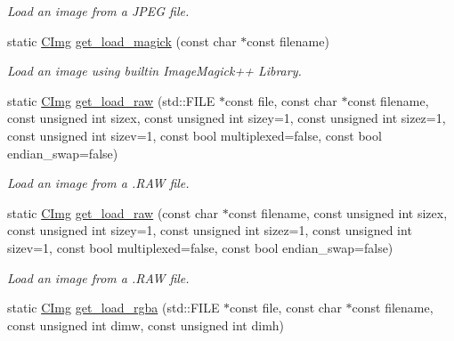 \begin{DoxyCompactItemize}
\begin{DoxyCompactList}\small\item\em Load an image from a J\-P\-E\-G file. \end{DoxyCompactList}\item 
static \hyperlink{structcimg__library_1_1_c_img}{C\-Img} \hyperlink{structcimg__library_1_1_c_img_a263aadb8d074a96e73f67908853ef501}{get\-\_\-load\-\_\-magick} (const char $\ast$const filename)
\begin{DoxyCompactList}\small\item\em Load an image using builtin Image\-Magick++ Library. \end{DoxyCompactList}\item 
\hypertarget{structcimg__library_1_1_c_img_a980e8f9a7706398cfca97eca26b97a70}{static \hyperlink{structcimg__library_1_1_c_img}{C\-Img} \hyperlink{structcimg__library_1_1_c_img_a980e8f9a7706398cfca97eca26b97a70}{get\-\_\-load\-\_\-raw} (std\-::\-F\-I\-L\-E $\ast$const file, const char $\ast$const filename, const unsigned int sizex, const unsigned int sizey=1, const unsigned int sizez=1, const unsigned int sizev=1, const bool multiplexed=false, const bool endian\-\_\-swap=false)}\label{structcimg__library_1_1_c_img_a980e8f9a7706398cfca97eca26b97a70}

\begin{DoxyCompactList}\small\item\em Load an image from a .R\-A\-W file. \end{DoxyCompactList}\item 
\hypertarget{structcimg__library_1_1_c_img_a100f650f6012a82cb8818230da99e6e2}{static \hyperlink{structcimg__library_1_1_c_img}{C\-Img} \hyperlink{structcimg__library_1_1_c_img_a100f650f6012a82cb8818230da99e6e2}{get\-\_\-load\-\_\-raw} (const char $\ast$const filename, const unsigned int sizex, const unsigned int sizey=1, const unsigned int sizez=1, const unsigned int sizev=1, const bool multiplexed=false, const bool endian\-\_\-swap=false)}\label{structcimg__library_1_1_c_img_a100f650f6012a82cb8818230da99e6e2}

\begin{DoxyCompactList}\small\item\em Load an image from a .R\-A\-W file. \end{DoxyCompactList}\item 
\hypertarget{structcimg__library_1_1_c_img_aed4dc2820c667c07afcc3e362c23c117}{static \hyperlink{structcimg__library_1_1_c_img}{C\-Img} \hyperlink{structcimg__library_1_1_c_img_aed4dc2820c667c07afcc3e362c23c117}{get\-\_\-load\-\_\-rgba} (std\-::\-F\-I\-L\-E $\ast$const file, const char $\ast$const filename, const unsigned int dimw, const unsigned int dimh)}\label{structcimg__library_1_1_c_img_aed4dc2820c667c07afcc3e362c23c117}


\end{DoxyCompactItemize}

